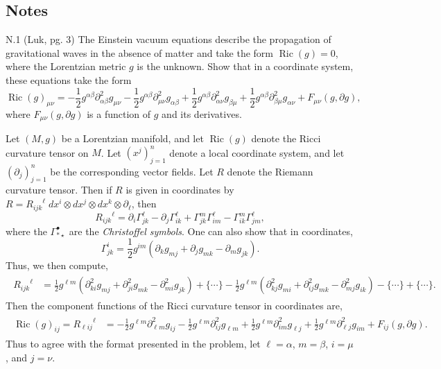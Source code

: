 \documentclass{article}
\begin{document}
\subsection{Notes}
\begin{prb}{N.1}
	(Luk, pg. 3) The Einstein vacuum equations describe the propagation of gravitational waves in the absence of matter and take the form $\operatorname{Ric}(g) = 0$, where the Lorentzian metric $g$ is the unknown. Show that in a coordinate system, these equations take the form 
	\begin{equation*}
		\operatorname{Ric}(g)_{\mu\nu} = -\frac{1}{2}g^{\alpha \beta}\partial^{2}_{\alpha\beta}g_{\mu\nu} - \frac{1}{2}g^{\alpha\beta}\partial^{2}_{\mu\nu} g_{\alpha\beta} + \frac{1}{2}g^{\alpha\beta}\partial^{2}_{\alpha \nu}g_{\beta \mu} + \frac{1}{2}g^{\alpha\beta}\partial^{2}_{\beta\mu}g_{\alpha\nu} + F_{\mu\nu}(g, \partial g), 
	\end{equation*}
	where $F_{\mu\nu}(g, \partial g)$ is a function of $g$ and its derivatives. 
\end{prb} 
Let $(M, g)$ be a Lorentzian manifold, and let $\operatorname{Ric}(g)$ denote the Ricci curvature tensor on $M$. Let $(x^{j})_{j = 1}^{n}$ denote a local coordinate system, and let $(\partial_{j})_{j = 1}^{n}$ be the corresponding vector fields. Let $R$ denote the Riemann curvature tensor. Then if $R$ is given in coordinates by $R = {R_{ijk}}^{\ell}\;dx^{i} \otimes dx^{j} \otimes dx^{k} \otimes \partial_{\ell}$, then 
\begin{equation*}
	{R_{ijk}}^{\ell} = \partial_{i}\Gamma^{\ell}_{jk} - \partial_{j}\Gamma^{\ell}_{ik} + \Gamma^{m}_{jk}\Gamma^{\ell}_{im} - \Gamma^{m}_{ik}\Gamma^{\ell}_{jm}, 
\end{equation*} 
where the $\Gamma^{\bullet}_{\ast \star}$ are the \textit{Christoffel symbols}. One can also show that in coordinates, 
\begin{equation*}
	\Gamma^{i}_{jk} = \frac{1}{2}g^{im}\left(\partial_{k}g_{mj} + \partial_{j}g_{mk} - \partial_{m}g_{jk}\right). 
\end{equation*}
Thus, we then compute, 
\begin{align*}
	\begin{split}
		{R_{ijk}}^{\ell} &= \frac{1}{2}g^{\ell m}\left(\partial^{2}_{ki}g_{mj} + \partial^{2}_{ji}g_{mk} - \partial^{2}_{mi}g_{jk}\right) + \{\dotsm\} - \frac{1}{2}g^{\ell m}\left(\partial^{2}_{kj}g_{mi} + \partial^{2}_{ij}g_{mk} - \partial^{2}_{mj}g_{ik}\right) - \{\dotsm\} + \{\dotsm\}. 
	\end{split} 
\end{align*}
Then the component functions of the Ricci curvature tensor in coordinates are, 
\begin{align*}
	\begin{split}
		\operatorname{Ric}(g)_{ij} = {R_{\ell ij}}^{\ell} &= -\frac{1}{2}g^{\ell m}\partial^{2}_{\ell m}g_{ij}  -\frac{1}{2}g^{\ell m}\partial^{2}_{i j}g_{\ell m} + \frac{1}{2}g^{\ell m}\partial^{2}_{im}g_{\ell j} + \frac{1}{2}g^{\ell m}\partial^{2}_{\ell j}g_{im} + F_{ij}(g, \partial g). 
	\end{split} 
\end{align*}
Thus to agree with the format presented in the problem, let $\ell = \alpha$, $m = \beta$, $i = \mu$, and $j = \nu$. 
\end{document}
